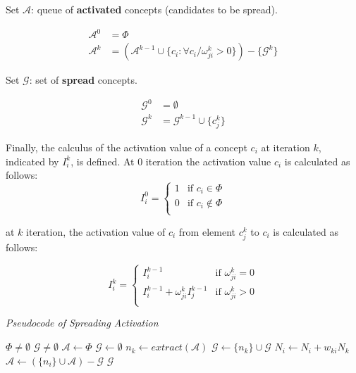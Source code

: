 Set $\mathcal{A}$: queue of {\bf activated} concepts (candidates to be
spread).

\begin{align}
 \mathcal{A}^0 &=\Phi \\
 \mathcal{A}^k &=(\mathcal{A}^{k-1} \cup \{c_i: {\forall c_i /  \omega_{ji}^k
>0}\})-{ \{\mathcal{G}^k}\}
\end{align}

Set $\mathcal{G}$: set of {\bf spread} concepts.

\begin{align}
 \mathcal{G}^0 &=\emptyset \\
 \mathcal{G}^k &= \mathcal{G}^{k-1} \cup \{c_j^k\}
\end{align}

Finally, the calculus of the activation value of a concept $c_i$
at iteration $k$, indicated by $I^k_i$, is defined. At $0$ iteration the
activation value $c_i$ is calculated as follows:
\begin{equation}
I^0_i=\begin{cases}%
  1 & \text{if $c_i \in \Phi$} \\%
  0 & \text{if $c_i \notin \Phi$} \\%
 \end{cases}
\end{equation}

at $k$ iteration, the activation value of $c_i$ from element
$c_j^{k}$ to $c_i$ is calculated as follows:

\begin{equation}
I^k_i=\begin{cases}%
  I^{k-1}_i & \text{if } \omega_{ji}^k = 0 \\%
  I^{k-1}_i + \omega_{ji}^k I^{k-1}_j  & \text{if }  \omega_{ji}^k > 0  \\%
 \end{cases}
\end{equation}

\begin{algorithm}
\caption{\textit{Pseudocode of Spreading Activation}}
\label{alg:as}
\begin{algorithmic}
  \REQUIRE $\Phi \neq \emptyset$  
  \ENSURE $\mathcal{G} \neq \emptyset$
  \STATE $\mathcal{A} \leftarrow \Phi$
  \STATE $\mathcal{G} \leftarrow \emptyset$
	\STATE $n_k \leftarrow  extract(\mathcal{A})$
	\STATE $\mathcal{G} \leftarrow \{n_k\} \cup \mathcal{G}$	  	
	  	\STATE $N_i \leftarrow N_i + w_{ki}N_k$	
		\STATE $\mathcal{A} \leftarrow (\{n_i\} \cup \mathcal{A}) -
\mathcal{G}$		
	    \ENDFOR
  \ENDWHILE
 \RETURN $\mathcal{G}$
\end{algorithmic}
\end{algorithm}\label{alg:as}

